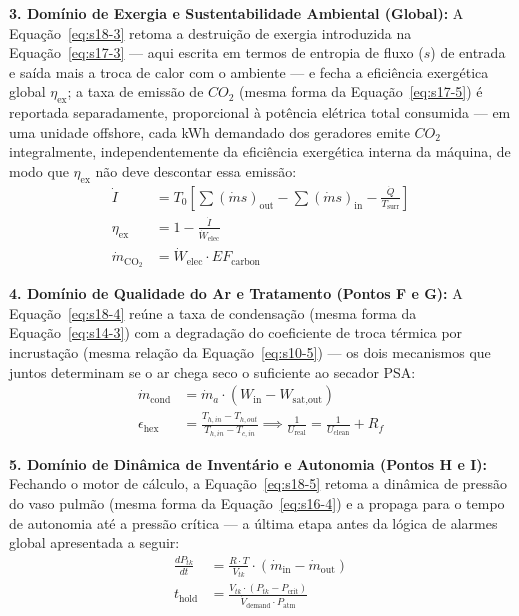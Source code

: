 \documentclass[12pt,a4paper]{article}
\numberwithin{equation}{section}
\numberwithin{table}{section}
\numberwithin{figure}{section}
\begin{document}
\textbf{3. Domínio de Exergia e Sustentabilidade Ambiental (Global):} A Equação~\eqref{eq:s18-3} retoma a destruição de exergia introduzida na Equação~\eqref{eq:s17-3} — aqui escrita em termos de entropia de fluxo ($s$) de entrada e saída mais a troca de calor com o ambiente — e fecha a eficiência exergética global $\eta_{\text{ex}}$; a taxa de emissão de $CO_2$ (mesma forma da Equação~\eqref{eq:s17-5}) é reportada separadamente, proporcional à potência elétrica total consumida — em uma unidade offshore, cada kWh demandado dos geradores emite $CO_2$ integralmente, independentemente da eficiência exergética interna da máquina, de modo que $\eta_{\text{ex}}$ não deve descontar essa emissão:
\begin{equation}\label{eq:s18-3}
\begin{aligned}
	\dot{I} &= T_0 \left[ \sum (\dot{m}s)_{\text{out}} - \sum (\dot{m}s)_{\text{in}} - \frac{\dot{Q}}{T_{\text{surr}}} \right] \\[8pt]
	\eta_{\text{ex}} &= 1 - \frac{\dot{I}}{\dot{W}_{\text{elec}}} \\[8pt]
	\dot{m}_{\text{CO}_2} &= \dot{W}_{\text{elec}} \cdotp EF_{\text{carbon}}
\end{aligned}
\end{equation}

\textbf{4. Domínio de Qualidade do Ar e Tratamento (Pontos F e G):} A Equação~\eqref{eq:s18-4} reúne a taxa de condensação (mesma forma da Equação~\eqref{eq:s14-3}) com a degradação do coeficiente de troca térmica por incrustação (mesma relação da Equação~\eqref{eq:s10-5}) — os dois mecanismos que juntos determinam se o ar chega seco o suficiente ao secador PSA:
\begin{equation}\label{eq:s18-4}
\begin{aligned}
	\dot{m}_{\text{cond}} &= \dot{m}_a \cdotp (W_{\text{in}} - W_{\text{sat,out}}) \\[8pt]
	\epsilon_{\text{hex}} &= \frac{T_{h,in} - T_{h,out}}{T_{h,in} - T_{c,in}} \implies \frac{1}{U_{\text{real}}} = \frac{1}{U_{\text{clean}}} + R_f
\end{aligned}
\end{equation}

\textbf{5. Domínio de Dinâmica de Inventário e Autonomia (Pontos H e I):} Fechando o motor de cálculo, a Equação~\eqref{eq:s18-5} retoma a dinâmica de pressão do vaso pulmão (mesma forma da Equação~\eqref{eq:s16-4}) e a propaga para o tempo de autonomia até a pressão crítica — a última etapa antes da lógica de alarmes global apresentada a seguir:
\begin{equation}\label{eq:s18-5}
\begin{aligned}
	\frac{dP_{tk}}{dt} &= \frac{R \cdotp T}{V_{tk}} \cdotp (\dot{m}_{\text{in}} - \dot{m}_{\text{out}}) \\[8pt]
	t_{\text{hold}} &= \frac{V_{tk} \cdotp (P_{tk} - P_{\text{crit}})}{\dot{V}_{\text{demand}} \cdotp P_{\text{atm}}}
\end{aligned}
\end{equation}
\end{document}
